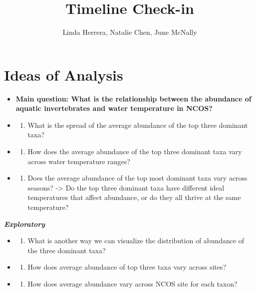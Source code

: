 \documentclass[
  letterpaper,
  DIV=11,
  numbers=noendperiod]{scrartcl}
\title{Timeline Check-in}
\author{Linda Herrera, Natalie Chen, June McNally}
\date{}
\providecommand{\tightlist}{%
  \setlength{\itemsep}{0pt}\setlength{\parskip}{0pt}}
\begin{document}
\maketitle


\section{Ideas of Analysis}\label{ideas-of-analysis}

\begin{itemize}
\item
  \textbf{Main question: What is the relationship between the abundance
  of aquatic invertebrates and water temperature in NCOS?}
\item
  \begin{enumerate}
  \def\labelenumi{\arabic{enumi}.}
  \tightlist
  \item
    What is the spread of the average abundance of the top three
    dominant taxa?
  \end{enumerate}
\item
  \begin{enumerate}
  \def\labelenumi{\arabic{enumi}.}
  \setcounter{enumi}{1}
  \tightlist
  \item
    How does the average abundance of the top three dominant taxa vary
    across water temperature ranges?
  \end{enumerate}
\item
  \begin{enumerate}
  \def\labelenumi{\arabic{enumi}.}
  \setcounter{enumi}{2}
  \tightlist
  \item
    Does the average abundance of the top most dominant taxa vary across
    seasons? -\textgreater{} Do the top three dominant taxa have
    different ideal temperatures that affect abundance, or do they all
    thrive at the same temperature?
  \end{enumerate}
\end{itemize}

\textbf{\emph{Exploratory}}

\begin{itemize}
\tightlist
\item
  \begin{enumerate}
  \def\labelenumi{\arabic{enumi}.}
  \setcounter{enumi}{3}
  \tightlist
  \item
    What is another way we can visualize the distribution of abundance
    of the three dominant taxa?
  \end{enumerate}
\item
  \begin{enumerate}
  \def\labelenumi{\arabic{enumi}.}
  \setcounter{enumi}{4}
  \tightlist
  \item
    How does average abundance of top three taxa vary across sites?
  \end{enumerate}
\item
  \begin{enumerate}
  \def\labelenumi{\arabic{enumi}.}
  \setcounter{enumi}{5}
  \tightlist
  \item
    How does average abundance vary across NCOS site for each taxon?
  \end{enumerate}
\end{itemize}
\end{document}
